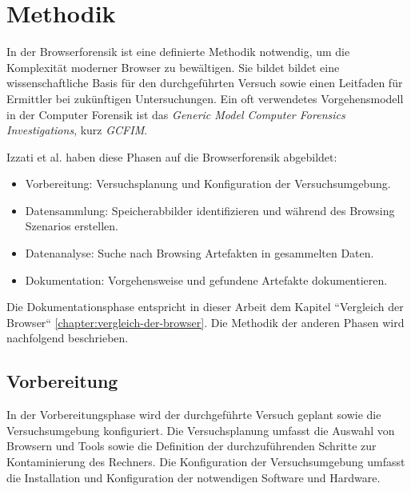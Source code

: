 \chapter{Methodik}
\label{chapter:methodik}
In der Browserforensik ist eine definierte Methodik notwendig, um die Komplexität moderner Browser zu bewältigen. Sie bildet bildet eine wissenschaftliche Basis für den durchgeführten Versuch sowie einen Leitfaden für Ermittler bei zukünftigen Untersuchungen. \cite{Aggarwal.2010, Izzati.2022, Horsman.2019}	
Ein oft verwendetes Vorgehensmodell in der Computer Forensik ist das \textit{Generic Model Computer Forensics Investigations}, kurz \textit{GCFIM}. \cite{Yusoff.2011}

Izzati et al. haben diese Phasen auf die Browserforensik abgebildet: \cite{Izzati.2022}
\begin{itemize}
	\item Vorbereitung: Versuchsplanung und Konfiguration der Versuchsumgebung.
	\item Datensammlung: Speicherabbilder identifizieren und während des Browsing Szenarios erstellen. 
	\item Datenanalyse: Suche nach Browsing Artefakten in gesammelten Daten.
	\item Dokumentation: Vorgehensweise und gefundene Artefakte dokumentieren.
\end{itemize}

Die Dokumentationsphase entspricht in dieser Arbeit dem Kapitel ``Vergleich der Browser`` \ref{chapter:vergleich-der-browser}. Die Methodik der anderen Phasen wird nachfolgend beschrieben.

\section{Vorbereitung}
\label{section:methodik-vorbereitung}
In der Vorbereitungsphase wird der durchgeführte Versuch geplant sowie die Versuchsumgebung konfiguriert. \cite{Izzati.2022} Die Versuchsplanung umfasst die Auswahl von Browsern und Tools sowie die Definition der durchzuführenden Schritte zur Kontaminierung des Rechners. Die Konfiguration der Versuchsumgebung umfasst die Installation und Konfiguration der notwendigen Software und Hardware.

